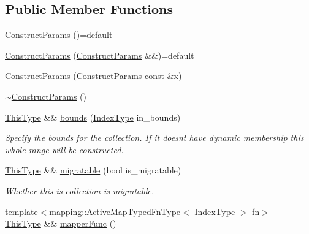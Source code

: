 \subsection*{Public Member Functions}
\begin{DoxyCompactItemize}
\item 
\hyperlink{structvt_1_1vrt_1_1collection_1_1param_1_1_construct_params_a0ea4f0b3c357c821f2de1147b40b8406}{Construct\+Params} ()=default
\item 
\hyperlink{structvt_1_1vrt_1_1collection_1_1param_1_1_construct_params_ab64595f80b2c21decb1052b8182bc065}{Construct\+Params} (\hyperlink{structvt_1_1vrt_1_1collection_1_1param_1_1_construct_params}{Construct\+Params} \&\&)=default
\item 
\hyperlink{structvt_1_1vrt_1_1collection_1_1param_1_1_construct_params_a430216ddd65cdd399c97c0e32cbc5e35}{Construct\+Params} (\hyperlink{structvt_1_1vrt_1_1collection_1_1param_1_1_construct_params}{Construct\+Params} const \&x)
\item 
\hyperlink{structvt_1_1vrt_1_1collection_1_1param_1_1_construct_params_a554d80e7579966d403ab9ce3192cc917}{$\sim$\+Construct\+Params} ()
\item 
\hyperlink{structvt_1_1vrt_1_1collection_1_1param_1_1_construct_params_a13d4910c0f6825c7b0ddfebce5288bea}{This\+Type} \&\& \hyperlink{structvt_1_1vrt_1_1collection_1_1param_1_1_construct_params_a51f2e63f9685930f39c646886e778c32}{bounds} (\hyperlink{structvt_1_1vrt_1_1collection_1_1param_1_1_construct_params_a7bc8d5d57e377e0f2e60031582eeb7e6}{Index\+Type} in\+\_\+bounds)
\begin{DoxyCompactList}\small\item\em Specify the bounds for the collection. If it doesn\textquotesingle{}t have dynamic membership this whole range will be constructed. \end{DoxyCompactList}\item 
\hyperlink{structvt_1_1vrt_1_1collection_1_1param_1_1_construct_params_a13d4910c0f6825c7b0ddfebce5288bea}{This\+Type} \&\& \hyperlink{structvt_1_1vrt_1_1collection_1_1param_1_1_construct_params_ae84568f9ea86b3b5a5aa86eca8962db0}{migratable} (bool is\+\_\+migratable)
\begin{DoxyCompactList}\small\item\em Whether this is collection is migratable. \end{DoxyCompactList}\item 
{\footnotesize template$<$mapping\+::\+Active\+Map\+Typed\+Fn\+Type$<$ Index\+Type $>$ fn$>$ }\\\hyperlink{structvt_1_1vrt_1_1collection_1_1param_1_1_construct_params_a13d4910c0f6825c7b0ddfebce5288bea}{This\+Type} \&\& \hyperlink{structvt_1_1vrt_1_1collection_1_1param_1_1_construct_params_af1b7987a920abbb7bed2cc49e4cfb85e}{mapper\+Func} ()

\end{DoxyCompactItemize}
